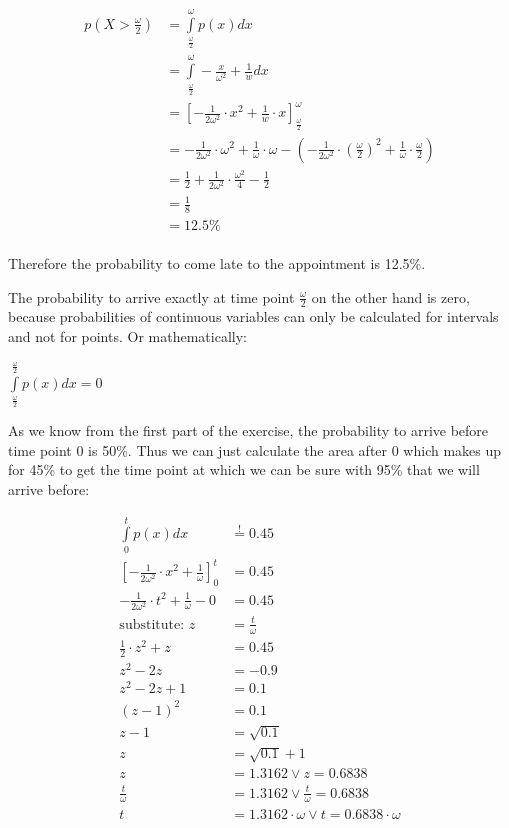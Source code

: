 \begin{align*}
  p\left(X > \frac{\omega}{2}\right) &= \int\limits_{\frac{\omega}{2}}^{\omega} p(x) dx \\
  &= \int\limits_{\frac{\omega}{2}}^{\omega} -\frac{x}{\omega^2} + \frac{1}{w} dx \\
  &= \left[-\frac{1}{2\omega^2}\cdot x^2 + \frac{1}{w}\cdot x\right]_{\frac{\omega}{2}}^{\omega} \\
  &= -\frac{1}{2\omega^2}\cdot \omega^2 + \frac{1}{\omega}\cdot \omega - \left(-\frac{1}{2\omega^2}\cdot \left(\frac{\omega}{2}\right)^2 + \frac{1}{\omega}\cdot \frac{\omega}{2}\right) \\
  &= \frac{1}{2} + \frac{1}{2\omega^2}\cdot\frac{\omega^2}{4} - \frac{1}{2}\\
  &= \frac{1}{8}\\
  &= 12.5\% \\
\end{align*}

Therefore the probability to come late to the appointment is 12.5\%.

The probability to arrive exactly at time point $\frac{\omega}{2}$ on the other hand is zero, because probabilities of continuous variables can only be calculated for intervals and not for points. Or mathematically:

$\int\limits_{\frac{\omega}{2}}^{\frac{\omega}{2}} p(x)dx = 0$

As we know from the first part of the exercise, the probability to arrive before time point 0 is 50\%. Thus we can just calculate the area after 0 which makes up for 45\% to get the time point at which we can be sure with 95\%  that we will arrive before:

\begin{align*}
  \int\limits_{0}^{t} p(x)dx &\stackrel{!}{=} 0.45 \\
  \left[-\frac{1}{2\omega^2}\cdot x^2 + \frac{1}{\omega}\right]_0^t & = 0.45 \\
  -\frac{1}{2\omega^2}\cdot t^2 + \frac{1}{\omega} - 0 &= 0.45 \\
 \mbox{substitute: }z&=\frac{t}{\omega} \\
  \frac{1}{2}\cdot z^2 + z &= 0.45 \\
  z^2 - 2z &= -0.9 \\
  z^2 - 2z + 1 &= 0.1 \\
  \left(z-1\right)^2 &= 0.1 \\
  z-1 &= \sqrt{0.1} \\
  z &= \sqrt{0.1} + 1 \\
  z &= 1.3162 \vee  z = 0.6838 \\
  \frac{t}{\omega} &= 1.3162 \vee  \frac{t}{\omega} = 0.6838 \\
  t &= 1.3162\cdot \omega \vee t  = 0.6838 \cdot \omega
\end{align*}

